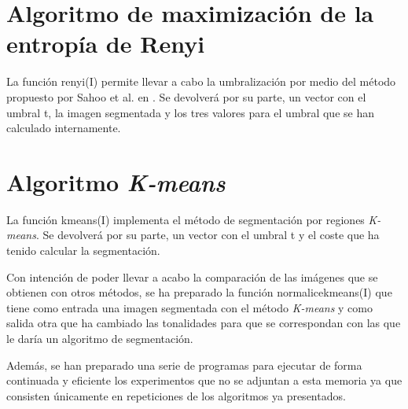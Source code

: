 \documentclass[main]{subfiles}
\begin{document}
\section{Algoritmo de maximización de la entropía de Renyi}
La función {\ttfamily renyi(I)} permite llevar a cabo la umbralización por medio del método propuesto por Sahoo et al. en \cite{art:sahoo}. Se devolverá por su parte, un vector con el umbral {\ttfamily t}, la imagen segmentada y los tres valores para el umbral que se han calculado internamente.

\bgroup
{}
\egroup

\section{Algoritmo {\em K-means}}
La función {\ttfamily kmeans(I)} implementa el método de segmentación por regiones {\em K-means}. Se devolverá por su parte, un vector con el umbral {\ttfamily t} y el coste que ha tenido calcular la segmentación.

\bgroup
{}
\egroup

Con intención de poder llevar a acabo la comparación de las imágenes que se obtienen con otros métodos, se ha preparado la función {\ttfamily normalicekmeans(I)} que tiene como entrada una imagen segmentada con el método {\em K-means} y como salida otra que ha cambiado las tonalidades para que se correspondan con las que le daría un algoritmo de segmentación.

\bgroup
{}
\egroup

Además, se han preparado una serie de programas para ejecutar de forma continuada y eficiente los experimentos que no se adjuntan a esta memoria ya que consisten únicamente en repeticiones de los algoritmos ya presentados.
\end{document}
